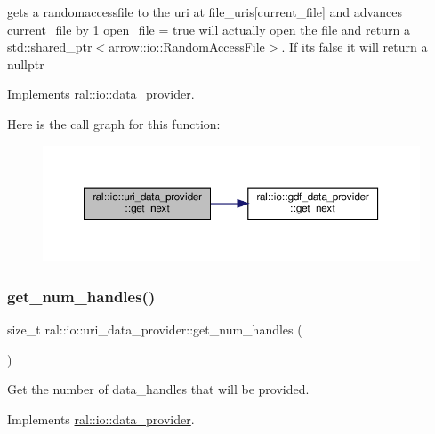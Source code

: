 gets a randomaccessfile to the uri at file\+\_\+uris\mbox{[}current\+\_\+file\mbox{]} and advances current\+\_\+file by 1 open\+\_\+file = true will actually open the file and return a std\+::shared\+\_\+ptr$<$arrow\+::io\+::\+Random\+Access\+File$>$. If its false it will return a nullptr 

Implements \hyperlink{classral_1_1io_1_1data__provider_aa49cde8c92f3bc4e9fcbe2e8f34e7ba3}{ral\+::io\+::data\+\_\+provider}.

Here is the call graph for this function\+:\nopagebreak
\begin{figure}[H]
\begin{center}
\leavevmode
\includegraphics[width=350pt]{classral_1_1io_1_1uri__data__provider_a189c193c14fdabc3dd84dca1385688d0_cgraph}
\end{center}
\end{figure}
\mbox{\label{classral_1_1io_1_1uri__data__provider_a89a2e8bd07ce00025d62e877ae56a871}} 
\subsubsection{\texorpdfstring{get\+\_\+num\+\_\+handles()}{get\_num\_handles()}}
{\footnotesize\ttfamily size\+\_\+t ral\+::io\+::uri\+\_\+data\+\_\+provider\+::get\+\_\+num\+\_\+handles (\begin{DoxyParamCaption}{ }\end{DoxyParamCaption})\hspace{0.3cm}{\ttfamily [virtual]}}

Get the number of data\+\_\+handles that will be provided. 

Implements \hyperlink{classral_1_1io_1_1data__provider_a00ff9cc629a869d7b7e6a67c90056749}{ral\+::io\+::data\+\_\+provider}.

